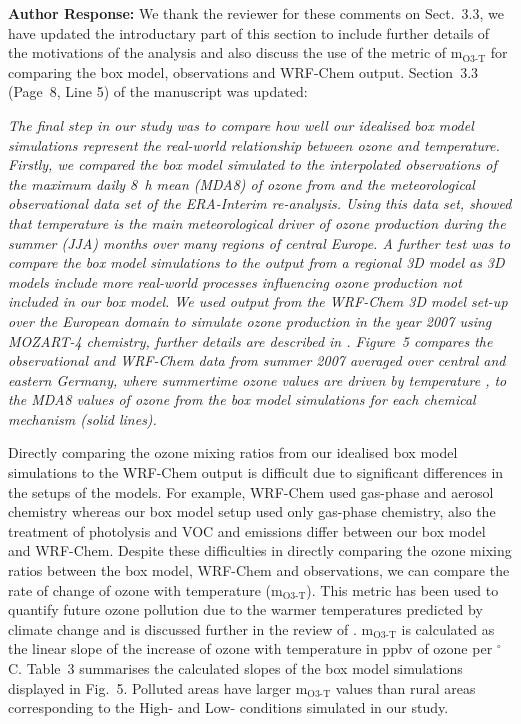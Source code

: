 \documentclass{article}
\DeclareRobustCommand*\degree{\ensuremath{^{\circ}}}
\begin{document}
\textbf{Author Response:} We thank the reviewer for these comments on Sect.~3.3, we have updated the introductary part of this section to include further details of the motivations of the analysis and also discuss the use of the metric of m$_{\text{O3-T}}$ for comparing the box model, observations and WRF-Chem output. Section~3.3 (Page~8, Line 5) of the manuscript was updated:
{\itshape
The final step in our study was to compare how well our idealised box model simulations represent the real-world relationship between ozone and temperature.
Firstly, we compared the box model simulated to the interpolated observations of the maximum daily 8~h mean (MDA8) of ozone from \citet{Schnell:2015} and the meteorological observational data set of the ERA-Interim re-analysis.
Using this data set, \citet{Otero:2016} showed that temperature is the main meteorological driver of ozone production during the summer (JJA) months over many regions of central Europe.
A further test was to compare the box model simulations to the output from a regional 3D model as 3D models include more real-world processes influencing ozone production not included in our box model.
We used output from the WRF-Chem 3D model set-up over the European domain to simulate ozone production in the year 2007 using MOZART-4 chemistry, further details are described in \citet{Mar:2016}.
Figure~5 compares the observational and WRF-Chem data from summer 2007 averaged over central and eastern Germany, where summertime ozone values are driven by temperature \citep{Otero:2016}, to the MDA8 values of ozone from the box model simulations for each chemical mechanism (solid lines).

Directly comparing the ozone mixing ratios from our idealised box model simulations to the WRF-Chem output is difficult due to significant differences in the setups of the models.
For example, WRF-Chem used gas-phase and aerosol chemistry whereas our box model setup used only gas-phase chemistry, also the treatment of photolysis and VOC and  emissions differ between our box model and WRF-Chem.
Despite these difficulties in directly comparing the ozone mixing ratios between the box model, WRF-Chem and observations, we can compare the rate of change of ozone with temperature (m$_{\text{O3-T}}$).
This metric has been used to quantify future ozone pollution due to the warmer temperatures predicted by climate change \citep{Dawson:2007, Rasmussen:2013} and is discussed further in the review of \citet{Pusede:2015}.
m$_{\text{O3-T}}$ is calculated as the linear slope of the increase of ozone with temperature in ppbv of ozone per \degree C.
Table~3 summarises the calculated slopes of the box model simulations displayed in Fig.~5.
Polluted areas have larger m$_{\text{O3-T}}$ values than rural areas corresponding to the High- and Low- conditions simulated in our study.
}
\end{document}
